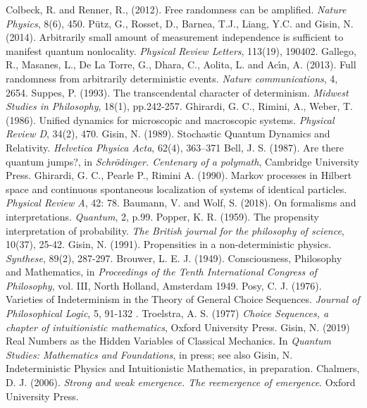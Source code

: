 \documentclass[12pt]{article}
\begin{document}
\begin{small}
\begin{thebibliography}{200}
 Colbeck, R. and Renner, R., (2012). Free randomness can be amplified. \emph{Nature Physics}, 8(6), 450.
 P{\"u}tz, G., Rosset, D., Barnea, T.J., Liang, Y.C. and Gisin, N. (2014). Arbitrarily small amount of measurement independence is sufficient to manifest quantum nonlocality. \emph{Physical Review Letters}, 113(19), 190402.
 Gallego, R., Masanes, L., De La Torre, G., Dhara, C., Aolita, L. and Ac{\'\i}n, A. (2013). Full randomness from arbitrarily deterministic events. \emph{Nature communications}, 4, 2654.
 Suppes, P. (1993). The transcendental character of determinism. \emph{Midwest Studies in Philosophy}, 18(1), pp.242-257.
 Ghirardi, G. C., Rimini, A., Weber, T. (1986). Unified dynamics for microscopic and macroscopic systems. \emph{Physical Review D}, 34(2), 470.
 Gisin, N. (1989). Stochastic Quantum Dynamics and Relativity. \emph{Helvetica Physica Acta}, 62(4), 363–371
 Bell, J. S. (1987). Are there quantum jumps?, in \emph{Schr{\"o}dinger. Centenary of a polymath}, Cambridge University Press.
 Ghirardi, G. C., Pearle P., Rimini A. (1990). Markov processes in Hilbert space and continuous spontaneous localization of systems of identical particles. \emph{Physical Review A}, 42: 78.
 Baumann, V. and Wolf, S. (2018). On formalisms and interpretations. \emph{Quantum}, 2, p.99.
 Popper, K. R. (1959). The propensity interpretation of probability. \emph{The British journal for the philosophy of science}, 10(37), 25-42.
 Gisin, N. (1991). Propensities in a non-deterministic physics. \emph{Synthese}, 89(2), 287-297.
 Brouwer, L. E. J. (1949). Consciousness, Philosophy and Mathematics, in \emph{Proceedings of the Tenth International Congress of Philosophy}, vol. III, North Holland, Amsterdam 1949.
 Posy,  C. J. (1976). Varieties of Indeterminism in the Theory of General Choice Sequences. \emph{Journal of Philosophical Logic}, 5, 91-132 .
 Troelstra, A. S. (1977)  {\it Choice Sequences, a chapter of intuitionistic mathematics}, Oxford University Press.
 Gisin, N. (2019)  Real Numbers as the Hidden Variables of Classical Mechanics. In \emph{Quantum Studies: Mathematics and Foundations}, in press; see also Gisin, N. Indeterministic Physics and Intuitionistic Mathematics, in preparation.
 Chalmers, D. J. (2006). \emph{Strong and weak emergence. The reemergence of emergence}. Oxford University Press.

\end{thebibliography}
\end{small}
\end{document}
